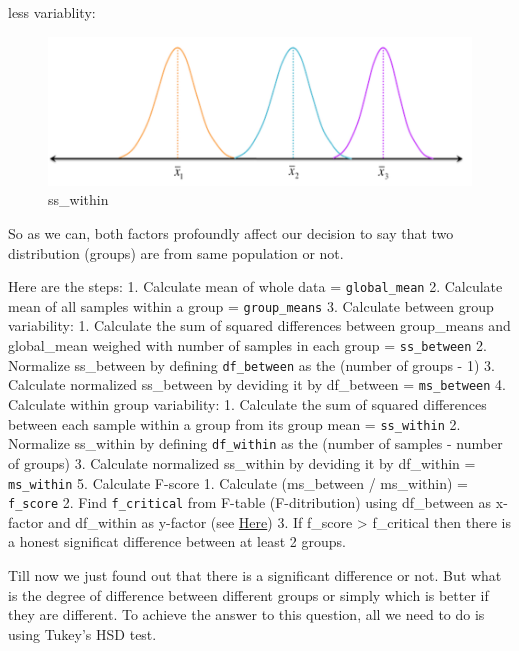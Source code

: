 \documentclass[11pt]{article}
\makeatletter
\def\maxwidth{\ifdim\Gin@nat@width>\linewidth\linewidth
    \else\Gin@nat@width\fi}
\let\Oldincludegraphics\includegraphics
\renewcommand{\includegraphics}[1]{\Oldincludegraphics[width=.8\maxwidth]{#1}}
\makeatother
\begin{document}
less variablity:

\begin{figure}
\centering
\includegraphics{wiki/4.png}
\caption{ss\_within}
\end{figure}

So as we can, both factors profoundly affect our decision to say that
two distribution (groups) are from same population or not.

Here are the steps: 1. Calculate mean of whole data =
\texttt{global\_mean} 2. Calculate mean of all samples within a group =
\texttt{group\_means} 3. Calculate between group variability: 1.
Calculate the sum of squared differences between group\_means and
global\_mean weighed with number of samples in each group =
\texttt{ss\_between} 2. Normalize ss\_between by defining
\texttt{df\_between} as the (number of groups - 1) 3. Calculate
normalized ss\_between by deviding it by df\_between =
\texttt{ms\_between} 4. Calculate within group variability: 1. Calculate
the sum of squared differences between each sample within a group from
its group mean = \texttt{ss\_within} 2. Normalize ss\_within by defining
\texttt{df\_within} as the (number of samples - number of groups) 3.
Calculate normalized ss\_within by deviding it by df\_within =
\texttt{ms\_within} 5. Calculate F-score 1. Calculate (ms\_between /
ms\_within) = \texttt{f\_score} 2. Find \texttt{f\_critical} from
F-table (F-ditribution) using df\_between as x-factor and df\_within as
y-factor (see
\href{https://www.dummies.com/education/math/business-statistics/how-to-find-the-critical-values-for-an-anova-hypothesis-using-the-f-table/}{Here})
3. If f\_score \textgreater{} f\_critical then there is a honest
significat difference between at least 2 groups.

Till now we just found out that there is a significant difference or
not. But what is the degree of difference between different groups or
simply which is better if they are different. To achieve the answer to
this question, all we need to do is using Tukey's HSD test.
\end{document}
